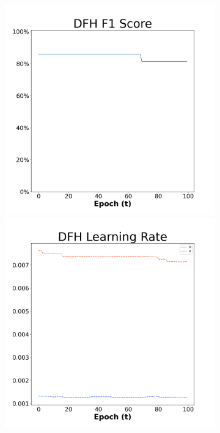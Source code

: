 \begin{figure}[H]
    \centering %
\begin{subfigure}{0.3\textwidth}
  \includegraphics[width=\linewidth]{images/exper2/Sonar/DFH_0.01_f1.png}
    \includegraphics[width=\linewidth]{images/exper2/Sonar/DFH_0.01_lr.png}

\end{subfigure}
\end{figure}
